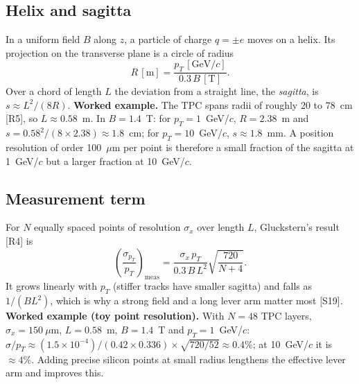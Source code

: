 \documentclass[11pt,letterpaper]{article}
\begin{document}
\subsection{Helix and sagitta}
In a uniform field $B$ along $z$, a particle of charge $q=\pm e$ moves on a helix. Its projection on the transverse plane is a circle of radius
\begin{equation}
R\,[\mathrm{m}] = \frac{p_T\,[\mathrm{GeV}/c]}{0.3\,B\,[\mathrm{T}]}.
\end{equation}
Over a chord of length $L$ the deviation from a straight line, the \emph{sagitta}, is $s\approx L^2/(8R)$.
\textbf{Worked example.} The TPC spans radii of roughly 20 to 78~cm [R5], so $L\approx0.58$~m. In $B=1.4$~T:
for $p_T=1$~GeV/$c$, $R=2.38$~m and $s=0.58^2/(8\times2.38)\approx1.8$~cm; for $p_T=10$~GeV/$c$, $s\approx1.8$~mm.
A position resolution of order 100~$\mu$m per point is therefore a small fraction of the sagitta at 1~GeV/$c$ but a larger fraction at 10~GeV/$c$.

\subsection{Measurement term}
For $N$ equally spaced points of resolution $\sigma_x$ over length $L$, Gluckstern's result [R4] is
\begin{equation}
\left(\frac{\sigma_{p_T}}{p_T}\right)_{\mathrm{meas}} = \frac{\sigma_x\,p_T}{0.3\,B\,L^2}\sqrt{\frac{720}{N+4}} .
\end{equation}
It grows linearly with $p_T$ (stiffer tracks have smaller sagitta) and falls as $1/(BL^2)$, which is why a strong field and a long lever arm matter most [S19].
\textbf{Worked example (toy point resolution).} With $N=48$ TPC layers, $\sigma_x=150~\mu$m, $L=0.58$~m, $B=1.4$~T and $p_T=1$~GeV/$c$:
$\sigma/p_T\approx(1.5\times10^{-4})/(0.42\times0.336)\times\sqrt{720/52}\approx0.4\%$; at 10~GeV/$c$ it is $\approx4\%$.
Adding precise silicon points at small radius lengthens the effective lever arm and improves this.
\end{document}
